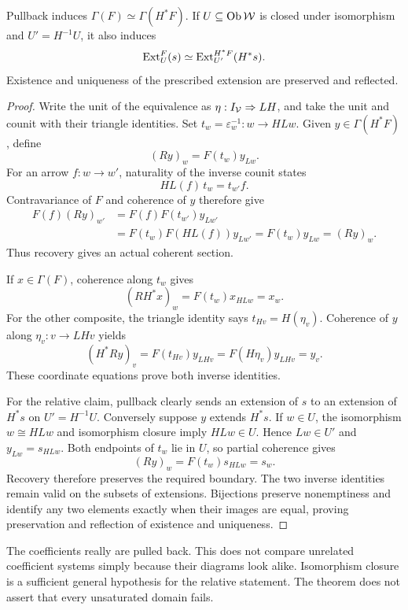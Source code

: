 \begin{KSproposition}\label{KS:KS37}
Pullback induces \(\Gamma(F)\simeq\Gamma(H^*F)\). If \(U\subseteq\operatorname{Ob}\mathcal W\) is closed under isomorphism and \(U'=H^{-1}U\), it also induces
\[
 \operatorname{Ext}_U^F(s)\simeq\operatorname{Ext}_{U'}^{H^*F}(H^*s).
\]
Existence and uniqueness of the prescribed extension are preserved and reflected.
\end{KSproposition}
\begin{proof}
Write the unit of the equivalence as $\eta:I_\mathcal V\Rightarrow LH$, and take the unit and counit with their triangle identities. Set $t_w=\varepsilon_w^{-1}:w\to HLw$. Given $y\in\Gamma(H^*F)$, define
\[
 (Ry)_w=F(t_w)y_{Lw}.
\]
For an arrow $f:w\to w'$, naturality of the inverse counit states
\[
 HL(f)\,t_w=t_{w'}f.
\]
Contravariance of $F$ and coherence of $y$ therefore give
\[
\begin{aligned}
 F(f)(Ry)_{w'}
 &=F(f)F(t_{w'})y_{Lw'}\\
 &=F(t_w)F(HL(f))y_{Lw'}
 =F(t_w)y_{Lw}=(Ry)_w.
\end{aligned}
\]
Thus recovery gives an actual coherent section.

If $x\in\Gamma(F)$, coherence along $t_w$ gives
\[
 (RH^*x)_w=F(t_w)x_{HLw}=x_w.
\]
For the other composite, the triangle identity says $t_{Hv}=H(\eta_v)$. Coherence of $y$ along $\eta_v:v\to LHv$ yields
\[
 (H^*Ry)_v=F(t_{Hv})y_{LHv}=F(H\eta_v)y_{LHv}=y_v.
\]
These coordinate equations prove both inverse identities.

For the relative claim, pullback clearly sends an extension of $s$ to an extension of $H^*s$ on $U'=H^{-1}U$. Conversely suppose $y$ extends $H^*s$. If $w\in U$, the isomorphism $w\cong HLw$ and isomorphism closure imply $HLw\in U$. Hence $Lw\in U'$ and $y_{Lw}=s_{HLw}$. Both endpoints of $t_w$ lie in $U$, so partial coherence gives
\[
 (Ry)_w=F(t_w)s_{HLw}=s_w.
\]
Recovery therefore preserves the required boundary. The two inverse identities remain valid on the subsets of extensions. Bijections preserve nonemptiness and identify any two elements exactly when their images are equal, proving preservation and reflection of existence and uniqueness.
\end{proof}
The coefficients really are pulled back. This does not compare unrelated coefficient systems simply because their diagrams look alike. Isomorphism closure is a sufficient general hypothesis for the relative statement. The theorem does not assert that every unsaturated domain fails.

